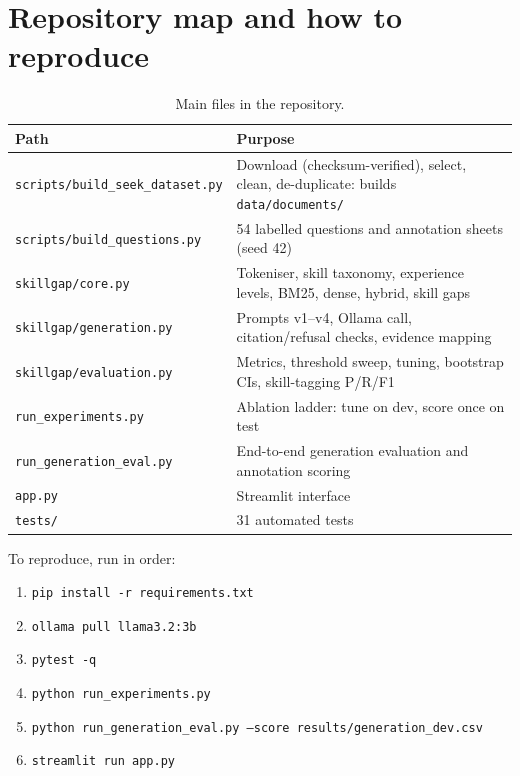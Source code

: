 \section{Repository map and how to reproduce}
\begin{table}[H]
\caption{Main files in the repository.}\label{tab:repo}
\small
\begin{tabularx}{\linewidth}{lY}
\toprule
Path & Purpose \\
\midrule
\texttt{scripts/build\_seek\_dataset.py} & Download (checksum-verified), select, clean, de-duplicate: builds \texttt{data/documents/} \\
\texttt{scripts/build\_questions.py} & 54 labelled questions and annotation sheets (seed 42) \\
\texttt{skillgap/core.py} & Tokeniser, skill taxonomy, experience levels, BM25, dense, hybrid, skill gaps \\
\texttt{skillgap/generation.py} & Prompts v1--v4, Ollama call, citation/refusal checks, evidence mapping \\
\texttt{skillgap/evaluation.py} & Metrics, threshold sweep, tuning, bootstrap CIs, skill-tagging P/R/F1 \\
\texttt{run\_experiments.py} & Ablation ladder: tune on dev, score once on test \\
\texttt{run\_generation\_eval.py} & End-to-end generation evaluation and annotation scoring \\
\texttt{app.py} & Streamlit interface \\
\texttt{tests/} & 31 automated tests \\
\bottomrule
\end{tabularx}
\end{table}

\noindent To reproduce, run in order:
\begin{enumerate}
  \item \texttt{pip install -r requirements.txt}
  \item \texttt{ollama pull llama3.2:3b}
  \item \texttt{pytest -q}
  \item \texttt{python run\_experiments.py}
  \item \texttt{python run\_generation\_eval.py --score results/generation\_dev.csv}
  \item \texttt{streamlit run app.py}
\end{enumerate}

